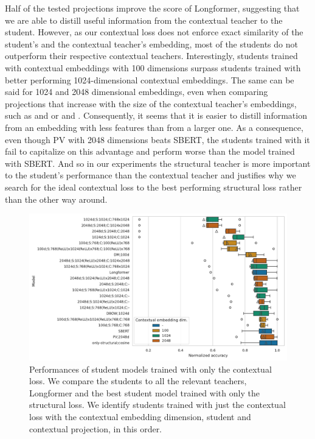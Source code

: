 Half of the tested projections improve the score of Longformer, suggesting that
we are able to distill useful information from the contextual teacher to the
student. However, as our contextual loss does not enforce exact similarity of
the student's and the contextual teacher's embedding, most of the students do
not outperform their respective contextual teachers. Interestingly, students
trained with contextual embeddings with 100 dimensions surpass students trained
with better performing 1024-dimensional contextual embeddings. The same can be
said for 1024 and 2048 dimensional embeddings, even when comparing projections
that increase with the size of the contextual teacher's embeddings, such as
 and  or
 and . Consequently, it
seems that it is easier to distill information from an embedding with less
features than from a larger one. As a consequence, even though PV with 2048
dimensions beats SBERT, the students trained with it fail to capitalize on this
advantage and perform worse than the model trained with SBERT. And so in our
experiments the structural teacher is more important to the student's
performance than the contextual teacher and justifies why we search for the
ideal contextual loss to the best performing structural loss rather than the
other way around.

\begin{figure}

  \centering

  \includegraphics[width=\textwidth]{img/projections_contextual.pdf}

  \caption{Performances of student models trained with only the contextual
  loss. We compare the students to all the relevant teachers, Longformer and
  the best student model trained with only the structural loss. We identify
  students trained with just the contextual loss with the contextual embedding
  dimension, student and contextual projection, in this order.}

  \label{fig:projections_contextual}

\end{figure}

